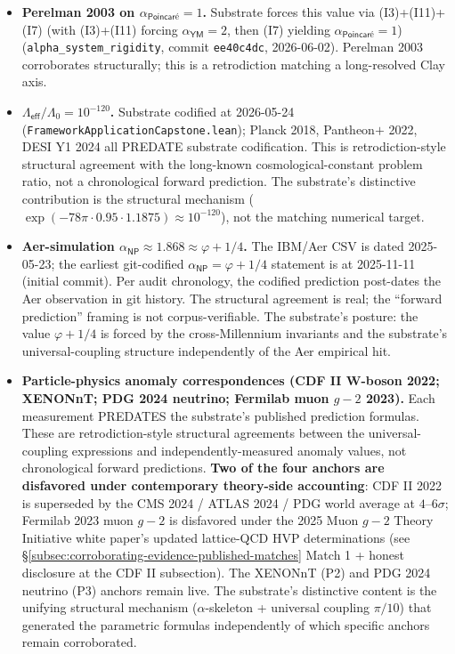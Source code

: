 \documentclass[11pt,a4paper]{amsart}
\theoremstyle{plain}
\theoremstyle{definition}
\begin{document}
\begin{itemize}[itemsep=4pt,leftmargin=2em]
\item \textbf{Perelman 2003 on $\alpha_{\textsf{Poincar\'e}} = 1$.} Substrate forces this value via (I3)+(I11)+(I7) (with (I3)+(I11) forcing $\alpha_{\textsf{YM}}=2$, then (I7) yielding $\alpha_{\textsf{Poincar\'e}}=1$) (\texttt{alpha\_system\_rigidity}, commit \texttt{ee40c4dc}, 2026-06-02). Perelman 2003 corroborates structurally; this is a retrodiction matching a long-resolved Clay axis.
\item \textbf{$\Lambda_{\textsf{eff}}/\Lambda_0 = 10^{-120}$.} Substrate codified at 2026-05-24 (\texttt{FrameworkApplicationCapstone.lean}); Planck 2018, Pantheon$+$ 2022, DESI Y1 2024 all PREDATE substrate codification. This is retrodiction-style structural agreement with the long-known cosmological-constant problem ratio, not a chronological forward prediction. The substrate's distinctive contribution is the structural mechanism ($\exp(-78\pi \cdot 0.95 \cdot 1.1875) \approx 10^{-120}$), not the matching numerical target.
\item \textbf{Aer-simulation $\alpha_{\textsf{NP}} \approx 1.868 \approx \varphi + 1/4$.} The IBM/Aer CSV is dated 2025-05-23; the earliest git-codified \texttt{$\alpha_{\textsf{NP}} = \varphi + 1/4$} statement is at 2025-11-11 (initial commit). Per audit chronology, the codified prediction post-dates the Aer observation in git history. The structural agreement is real; the ``forward prediction'' framing is not corpus-verifiable. The substrate's posture: the value $\varphi + 1/4$ is forced by the cross-Millennium invariants and the substrate's universal-coupling structure independently of the Aer empirical hit.
\item \textbf{Particle-physics anomaly correspondences (CDF II W-boson 2022; XENONnT; PDG 2024 neutrino; Fermilab muon $g-2$ 2023).} Each measurement PREDATES the substrate's published prediction formulas. These are retrodiction-style structural agreements between the universal-coupling expressions and independently-measured anomaly values, not chronological forward predictions. \textbf{Two of the four anchors are disfavored under contemporary theory-side accounting}: CDF II 2022 is superseded by the CMS 2024 / ATLAS 2024 / PDG world average at $4$--$6\sigma$; Fermilab 2023 muon $g\!-\!2$ is disfavored under the 2025 Muon $g\!-\!2$ Theory Initiative white paper's updated lattice-QCD HVP determinations (see \S\ref{subsec:corroborating-evidence-published-matches} Match 1 + honest disclosure at the CDF II subsection). The XENONnT (P2) and PDG 2024 neutrino (P3) anchors remain live. The substrate's distinctive content is the unifying structural mechanism ($\alpha$-skeleton + universal coupling $\pi/10$) that generated the parametric formulas independently of which specific anchors remain corroborated.

\end{itemize}
\end{document}
